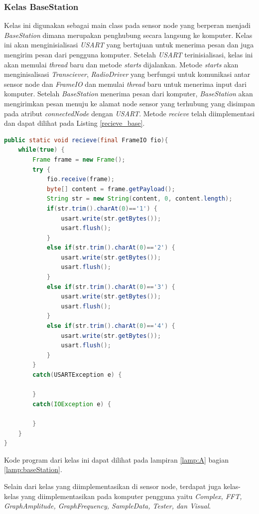 \subsubsection{Kelas BaseStation}
Kelas ini digunakan sebagai main class pada sensor node yang berperan menjadi \textit{BaseStation} dimana merupakan penghubung secara langsung ke komputer. Kelas ini akan menginisialisasi \textit{USART} yang bertujuan untuk menerima pesan dan juga mengirim pesan dari pengguna komputer. Setelah \textit{USART} terinisialisasi, kelas ini akan memulai \textit{thread} baru dan metode \textit{starts} dijalankan. Metode \textit{starts} akan menginisalisasi \textit{Transciever}, \textit{RadioDriver} yang berfungsi untuk komunikasi antar sensor node dan \textit{FrameIO} dan memulai \textit{thread} baru untuk menerima input dari komputer. Setelah \textit{BaseStation} menerima pesan dari komputer, \textit{BaseStation} akan mengirimkan pesan menuju ke alamat node sensor yang terhubung yang disimpan pada atribut \textit{connectedNode} dengan \textit{USART}. Metode \textit{recieve} telah diimplementasi dan dapat dilihat pada Listing \ref{recieve_base}.   
\begin{lstlisting}[language=Java, caption=Metode recieve(), label=recieve_base]
public static void recieve(final FrameIO fio){
	while(true) {
		Frame frame = new Frame();
		try {
			fio.receive(frame);
			byte[] content = frame.getPayload();
			String str = new String(content, 0, content.length);
			if(str.trim().charAt(0)=='1') {
				usart.write(str.getBytes());
				usart.flush();
			}
			else if(str.trim().charAt(0)=='2') {
				usart.write(str.getBytes());
				usart.flush();
			}
			else if(str.trim().charAt(0)=='3') {
				usart.write(str.getBytes());
				usart.flush();
			}
			else if(str.trim().charAt(0)=='4') {
				usart.write(str.getBytes());
				usart.flush();
			}
		}
		catch(USARTException e) {
			
		}
		catch(IOException e) {
			
		}
	}
}
\end{lstlisting}


Kode program dari kelas ini dapat dilihat pada lampiran \ref{lamp:A} bagian \ref{lamp:baseStation}.


Selain dari kelas yang diimplementasikan di sensor node, terdapat juga kelas-kelas yang diimplementasikan pada komputer pengguna yaitu \textit{Complex, FFT, GraphAmplitude, GraphFrequency, SampleData, Tester, dan Visual}.

